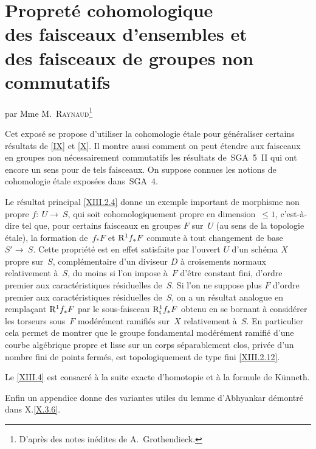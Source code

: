 \chapter[Propret\'e cohomologique des faisceaux d'ensembles...]{Propret\'e cohomologique\\ des faisceaux d'ensembles et\\ des faisceaux de groupes non commutatifs}
\label{XIII}

\begin{center}
{par Mme M.\ \textsc{Raynaud}\footnote{D'apr\`es des notes in\'edites de
A.\, Grothendieck.}}
\end{center}
\vspace*{1cm}

Cet expos\'e se propose d'utiliser la cohomologie \'etale pour
g\'en\'eraliser certains r\'esultats de \ref{IX} et \ref{X}. Il montre aussi
comment on peut \'etendre aux faisceaux en groupes non
n\'ecessairement commutatifs les r\'esultats de~SGA~5~II qui ont
encore un sens pour de tels faisceaux. On suppose connues les notions
de cohomologie \'etale expos\'ees dans~SGA~4.

Le r\'esultat principal \eqref{XIII.2.4} donne un exemple important
de morphisme non propre $f\colon~U\to~S$, qui soit \og cohomologiquement
propre en dimension~$\leq1$\fg, c'est-\`a-dire tel que, pour
certains faisceaux en groupes $F$ sur~$U$ (au sens de la topologie
\'etale), la formation de~$f_*F$ et $\mathrm{R}^1f_*F$ commute \`a tout
changement de base~$S'\to~S$. Cette propri\'et\'e est en effet
satisfaite par l'ouvert $U$ d'un sch\'ema $X$ propre sur~$S$,
compl\'ementaire d'un diviseur $D$ \`a croisements normaux
relativement \`a~$S$, du moins si l'on impose \`a~$F$ d'\^etre
constant fini, d'ordre premier aux caract\'eristiques
r\'esiduelles de~$S$. Si l'on ne suppose plus $F$ d'ordre premier
aux caract\'eristiques r\'esiduelles de~$S$, on a un r\'esultat
analogue en rempla\c cant $\mathrm{R}^1f_*F$ par le sous-faisceau
$\mathrm{R}^1_{\mathrm{t}}f_*F$ obtenu en se bornant \`a consid\'erer les torseurs
sous~$F$ \og mod\'er\'ement ramifi\'es sur~$X$ relativement
\`a~$S$\fg. En particulier cela permet de montrer que le groupe
fondamental mod\'er\'ement ramifi\'e d'une courbe alg\'ebrique
propre et lisse sur un corps s\'eparablement clos, priv\'ee d'un
nombre fini de points ferm\'es, est topologiquement de type fini
\eqref{XIII.2.12}.

Le
\no \ref{XIII.4} est consacr\'e \`a la suite exacte d'homotopie et \`a
la formule de K\"unneth.

Enfin un appendice donne des variantes utiles du lemme d'Abhyankar
d\'emontr\'e dans X.\ref{X.3.6}.

